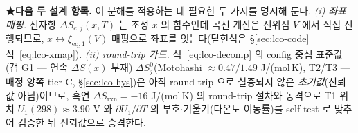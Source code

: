 \documentclass[11pt,a4paper]{article}
\newcommand{\eq}{\mathrm{eq}}
\newcommand{\rxn}{\mathrm{rxn}}
\begin{document}
\textbf{★다음 두 설계 항목.} 이 분해를 적용하는 데 필요한 두 가지를 명시해 둔다.
\emph{(i) 좌표 매핑.} 전자항 $\Delta S_{e,j}(x,T)$ 는 조성 $x$ 의 함수인데 곡선 계산은 전위점 $V$ 에서 직접 진행되므로,
$x\!\leftrightarrow\!\xi_{\eq,1}(V)$ 매핑으로 좌표를 잇는다(닫힌식은 \S\ref{sec:lco-code} 식~\eqref{eq:lco-xmap}). \emph{(ii) round-trip 가드.} 식~\eqref{eq:lco-decomp} 의 config 중심 표준값(갭 G1 --- 연속 $\Delta S(x)$ 부재)
$\Delta S_j^0$(Motohashi\cite{motohashi2009} $\approx0.47/1.49$ J/(mol\,K), T2/T3 — 배정 양쪽 tier C,
\S\ref{sec:lco-hys})은 아직 round-trip 으로 실증되지 않은
\emph{초기값}(신뢰값 아님)이므로, 흑연 $\Delta S_\rxn{=}-16$ J/(mol\,K) 의 round-trip 절차와 동격으로 T1 위치
$U_1(298)\approx3.90$ V 와 $\partial U_1/\partial T$ 의 부호$\cdot$기울기(다온도 이동률)를 self-test 로 맞추어
검증한 뒤 신뢰값으로 승격한다.
\end{document}
